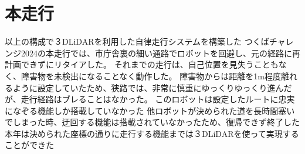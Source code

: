 \section{本走行}
以上の構成で３DLiDARを利用した自律走行システムを構築した
つくばチャレンジ2024の本走行では、市庁舎裏の細い通路でロボットを回避し、元の経路に再計画できずにリタイアした。
それまでの走行は、自己位置を見失うこともなく、障害物を未検出になることなく動作した。
障害物からは距離を1m程度離れるように設定していたため、狭路では、非常に慎重にゆっくりゆっくり進んだが、走行経路はブレることはなかった。
このロボットは設定したルートに忠実になぞる機能しか搭載していなかった
他ロボットが決められた道を長時間塞いでしまった時、迂回する機能は搭載されていなかったため、復帰できず終了した
本年は決められた座標の通りに走行する機能までは３DLiDARを使って実現することができた